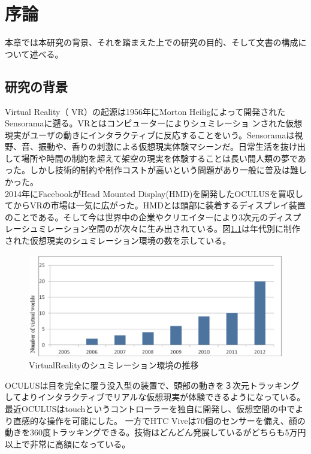\chapter{序論}
\label{chap:introduction}

本章では本研究の背景、それを踏まえた上での研究の目的、そして文書の構成について述べる。

\section{研究の背景}
Virtual Reality（ VR）の起源は1956年にMorton Heiligによって開発されたSensoramaに遡る。VRとはコンピューターによりシュミレーショ ンされた仮想現実がユーザの動きにインタラクティブに反応することをいう。Sensoramaは視野、音、振動や、香りの刺激による仮想現実体験マシーンだ\cite{sensorama}。日常生活を抜け出して場所や時間の制約を超えて架空の現実を体験することは長い間人類の夢であった\cite{verge}。しかし技術的制約や制作コストが高いという問題があり一般に普及は難しかった。\\

2014年にFacebookがHead Mounted Display(HMD)を開発したOCULUSを買収してからVRの市場は一気に広がった\cite{vrtrendShiny}。HMDとは頭部に装着するディスプレイ装置のことである。そして今は世界中の企業やクリエイターにより3次元のディスプレーシュミレーション空間のが次々に生み出されている。図\ref{trends}は年代別に制作された仮想現実のシュミレーション環境の数を示している\cite{vrtrendSamuel}。\\
\begin{figure}[htbp]
\begin{center}
\includegraphics[width=15cm]{eps/vrTrends.eps}
\caption{VirtualRealityのシュミレーション環境の推移}
\label{trends}
\end{center}
\end{figure}

OCULUSは目を完全に覆う没入型の装置で、頭部の動きを３次元トラッキングしてよりインタラクティブでリアルな仮想現実が体験できるようになっている。最近OCULUSはtouchというコントローラーを独自に開発し、仮想空間の中でより直感的な操作を可能にした\cite{touch}。
一方でHTC Viveは70個のセンサーを備え、顔の動きを360度トラッキングできる\cite{vive}。技術はどんどん発展しているがどちらも5万円以上で非常に高額になっている。\\

